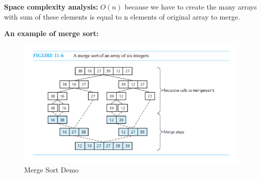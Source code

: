 \textbf{Space complexity analysis:} $O(n)$ because we have to create the many arrays with sum of these elements is equal to n elements of original array to merge.

\vspace{5pt}

\textbf{An example of merge sort:} ~\cite{ref2}

\begin{figure}[h]
    \centering
    \includegraphics[scale=0.7]{Figures/sort_demo/merge.png}
    \caption{Merge Sort Demo}
    \label{fig:enter-label}
\end{figure}

